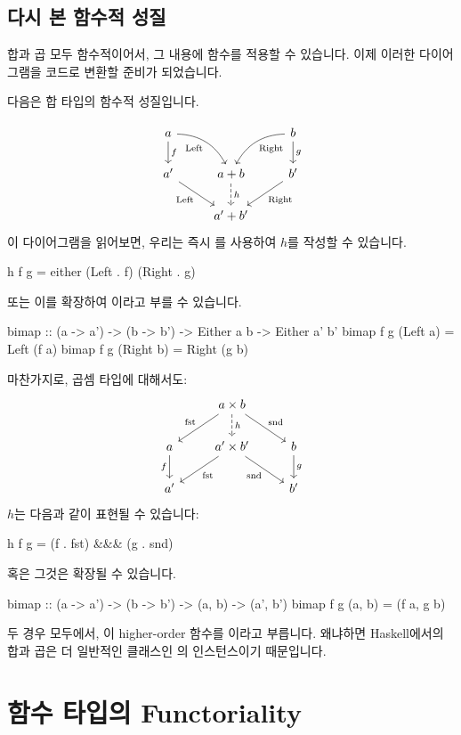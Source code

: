 \documentclass[DaoFP]{subfiles}
\begin{document}
\subsection{다시 본 함수적 성질}

합과 곱 모두 함수적이어서, 그 내용에 함수를 적용할 수 있습니다. 이제 이러한 다이어그램을 코드로 변환할 준비가 되었습니다.

다음은 합 타입의 함수적 성질입니다.

\[
 \begin{tikzcd}
 a
 \arrow[d, "f"]
 \arrow[dr,  bend left, "\text{Left}"']
  && b
 \arrow[d, "g"]
 \arrow[dl, bend right, "\text{Right}"]
 \\
 a'
 \arrow[rd, "\text{Left}"']
&a + b
\arrow[d, dashed, "h"]
& b'
\arrow[ld, "\text{Right}"]
\\
& a' + b'
 \end{tikzcd}
\]
이 다이어그램을 읽어보면, 우리는 즉시 를 사용하여 $h$를 작성할 수 있습니다.
\begin{haskell}
h f g = either (Left . f) (Right . g)
\end{haskell}
또는 이를 확장하여 이라고 부를 수 있습니다.
\begin{haskell}
bimap :: (a -> a') -> (b -> b') -> Either a b -> Either a' b'
bimap f g (Left  a) = Left  (f a)
bimap f g (Right b) = Right (g b)
\end{haskell}
마찬가지로, 곱셈 타입에 대해서도:
\[
 \begin{tikzcd}
 & a \times b
\arrow[d, dashed, "h"]
 \arrow[dl,  "\text{fst}"']
 \arrow[dr,   "\text{snd}"]
\\
a
\arrow[d, "f"']
&a' \times b'
 \arrow[dl,  "\text{fst}"]
  \arrow[dr,   "\text{snd}"']
& b
\arrow[d, "g"]
\\
a' && b'
 \end{tikzcd}
\]
$h$는 다음과 같이 표현될 수 있습니다:
\begin{haskell}
h f g = (f . fst) &&& (g . snd)
\end{haskell}
혹은 그것은 확장될 수 있습니다.
\begin{haskell}
bimap :: (a -> a') -> (b -> b') -> (a, b) -> (a', b')
bimap f g (a, b) = (f a, g b)
\end{haskell}
두 경우 모두에서, 이 higher-order 함수를 이라고 부릅니다. 왜냐하면 Haskell에서의 합과 곱은 더 일반적인 클래스인 의 인스턴스이기 때문입니다.

\section{함수 타입의 Functoriality}
\end{document}
